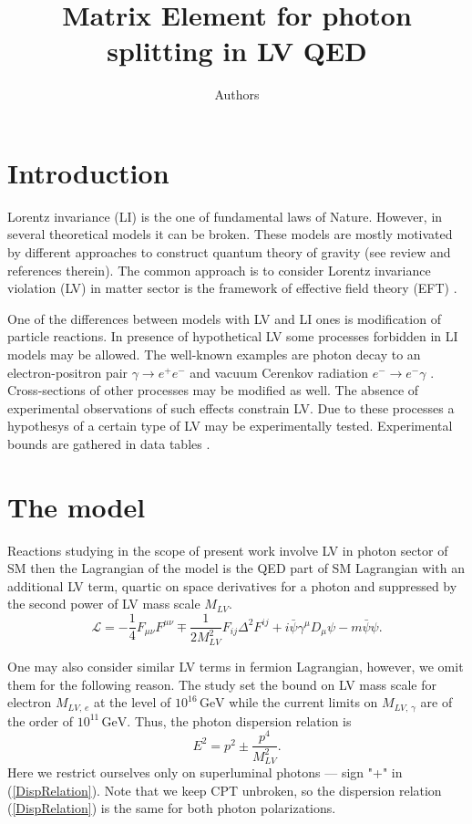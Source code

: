 \documentclass[12pt]{article}
\title{Matrix Element for photon splitting in LV QED}
\author{Authors}
\begin{document}
\maketitle


\section{Introduction}
\label{intro}

Lorentz invariance (LI) is the one of fundamental laws of Nature. However, in several theoretical models it can be broken. These models are mostly motivated by different approaches to construct quantum theory of gravity (see review \cite{Liberati:2013xla} and references therein). The common approach is to consider Lorentz invariance violation (LV) in matter sector is the framework of effective field theory (EFT) \cite{Colladay:1998fq}.  

One of the differences between models with LV and LI ones is modification of particle reactions. In presence of hypothetical LV some processes forbidden in LI models may be allowed. The well-known examples are photon decay to an electron-positron pair $\gamma \to e^+e^-$ and vacuum Cerenkov radiation $e^-\to e^-\gamma$ \cite{Coleman:1997xq}. Cross-sections of other processes may be modified as well. The absence of experimental observations of such effects constrain LV. Due to these processes a hypothesys of a certain type of LV may be experimentally tested. Experimental bounds are gathered in data tables \cite{Kostelecky:2008ts}.

\section{The model}
\label{The model}
Reactions studying in the scope of present work involve LV in photon sector of SM then the Lagrangian of the model is the QED part of SM Lagrangian with an additional LV term, quartic on space derivatives for a photon and suppressed by the second power of LV mass scale $M_{LV}$.
\begin{equation}\label{L1}
\mathcal{L}=-\frac{1}{4}F_{\mu\nu}F^{\mu\nu}  \mp \frac{1}{2 M_{LV}^2}F_{ij}\Delta^2 F^{ij}  +i\bar{\psi}\gamma^\mu D_\mu\psi - m\bar{\psi}\psi . 
\end{equation}

One may also consider similar LV terms in fermion Lagrangian, however, we omit them for the following reason. The study \cite{Liberati:2012jf} set the bound on LV mass scale for electron $M_{LV,\,e}$ at the level of $10^{16}\,\mbox{GeV}$ while the current limits \cite{Vasileiou:2013vra} on $M_{LV,\, \gamma}$  are of the order of $10^{11}\,\mbox{GeV}$. Thus, the photon dispersion relation is
\begin{equation}
\label{DispRelation}
E^2 = p^2 \pm \frac{p^4}{M_{LV}^2}.
\end{equation}
Here we restrict ourselves only on superluminal photons --- sign "+" in (\ref{DispRelation}). Note that we keep CPT unbroken, so the dispersion relation (\ref{DispRelation}) is the same for both photon polarizations.
\end{document}
